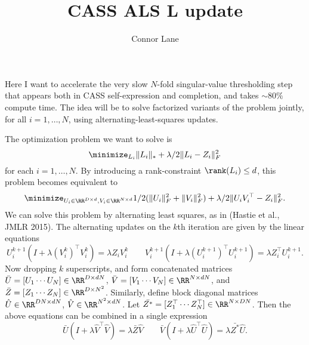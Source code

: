 \documentclass[11pt,letterpaper]{article}
\begin{document}
\title{CASS ALS L update}
\author{Connor Lane}
\maketitle

Here I want to accelerate the very slow $N$-fold singular-value thresholding
step that appears both in CASS self-expression and completion, and takes $\sim
80\%$ compute time. The idea will be to solve factorized variants of the
problem jointly, for all $i=1,\dotsc,N$, using alternating-least-squares
updates.

The optimization problem we want to solve is
\[\minimize_{L_i} \|L_i\|_* + \lambda/2 \|L_i - Z_i\|_F^2\]
for each $i=1,\dotsc,N$. By introducing a rank-constraint $\rank(L_i) \leq d$,
this problem becomes equivalent to
\[\minimize_{U_i\in \RR^{D \times d}, V_i \in \RR^{N \times d}} 1/2(\|U_i\|_F^2
+ \|V_i\|_F^2) + \lambda/2 \|U_i V_i^\top - Z_i\|_F^2.\]
We can solve this problem by alternating least squares, as in (Hastie et al.,
JMLR 2015). The alternating updates on the $k$th iteration are given by the
linear equations
\[ U_i^{k+1}(I + \lambda (V_i^{k})^\top V_i^{k}) = \lambda Z_i V^k_i \qquad
V_i^{k+1}(I + \lambda (U_i^{k+1})^\top U_i^{k+1}) = \lambda Z_i^\top U^{k+1}_i. \]
Now dropping $k$ superscripts, and form concatenated matrices $\bar{U} =
[U_1 \cdots U_N] \in \RR^{D \times d N}$, $\bar{V} = [V_1 \cdots V_N] \in
\RR^{N \times d N}$, and $\bar{Z} = [Z_1 \cdots Z_N] \in \RR^{D \times N^2}$.
Similarly, define block diagonal matrices $\hat{U}\in \RR^{DN \times d N}$,
$\hat{V}\in\RR^{N^2 \times d N}$. Let $\bar{Z^*} = [Z_1^\top \cdots
Z_N^\top] \in \RR^{N \times D N}$. Then the above equations can be combined in
a single expression \[ \bar{U}(I + \lambda \hat{V}^\top \hat{V}) = \lambda
\bar{Z} \hat{V} \qquad \bar{V}(I + \lambda \hat{U}^\top \hat{U}) = \lambda
\bar{Z^*} \hat{U}.\]
\end{document}
